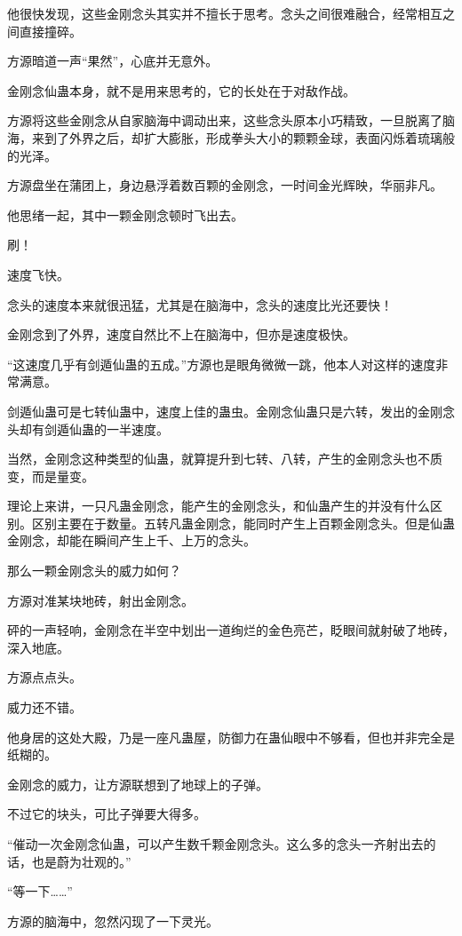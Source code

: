 \begin{this_body}
他很快发现，这些金刚念头其实并不擅长于思考。念头之间很难融合，经常相互之间直接撞碎。

方源暗道一声“果然”，心底并无意外。

金刚念仙蛊本身，就不是用来思考的，它的长处在于对敌作战。

方源将这些金刚念从自家脑海中调动出来，这些念头原本小巧精致，一旦脱离了脑海，来到了外界之后，却扩大膨胀，形成拳头大小的颗颗金球，表面闪烁着琉璃般的光泽。

方源盘坐在蒲团上，身边悬浮着数百颗的金刚念，一时间金光辉映，华丽非凡。

他思绪一起，其中一颗金刚念顿时飞出去。

刷！

速度飞快。

念头的速度本来就很迅猛，尤其是在脑海中，念头的速度比光还要快！

金刚念到了外界，速度自然比不上在脑海中，但亦是速度极快。

“这速度几乎有剑遁仙蛊的五成。”方源也是眼角微微一跳，他本人对这样的速度非常满意。

剑遁仙蛊可是七转仙蛊中，速度上佳的蛊虫。金刚念仙蛊只是六转，发出的金刚念头却有剑遁仙蛊的一半速度。

当然，金刚念这种类型的仙蛊，就算提升到七转、八转，产生的金刚念头也不质变，而是量变。

理论上来讲，一只凡蛊金刚念，能产生的金刚念头，和仙蛊产生的并没有什么区别。区别主要在于数量。五转凡蛊金刚念，能同时产生上百颗金刚念头。但是仙蛊金刚念，却能在瞬间产生上千、上万的念头。

那么一颗金刚念头的威力如何？

方源对准某块地砖，射出金刚念。

砰的一声轻响，金刚念在半空中划出一道绚烂的金色亮芒，眨眼间就射破了地砖，深入地底。

方源点点头。

威力还不错。

他身居的这处大殿，乃是一座凡蛊屋，防御力在蛊仙眼中不够看，但也并非完全是纸糊的。

金刚念的威力，让方源联想到了地球上的子弹。

不过它的块头，可比子弹要大得多。

“催动一次金刚念仙蛊，可以产生数千颗金刚念头。这么多的念头一齐射出去的话，也是蔚为壮观的。”

“等一下……”

方源的脑海中，忽然闪现了一下灵光。


\end{this_body}
